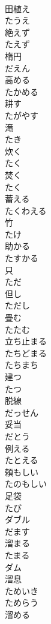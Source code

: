 \documentclass[8pt]{extreport}
\begin{document}
\begin{CJK}{UTF8}{min}
\\	田植え 
\\	たうえ	
\\	絶えず 
\\	たえず	
\\	楕円 
\\	だえん	
\\	高める 
\\	たかめる	
\\	耕す 
\\	たがやす	
\\	滝 
\\	たき	
\\	炊く 
\\	たく	
\\	焚く 
\\	たく	
\\	蓄える 
\\	たくわえる	
\\	竹 
\\	たけ	
\\	助かる 
\\	たすかる	
\\	只 
\\	ただ	
\\	但し 
\\	ただし	
\\	畳む 
\\	たたむ	
\\	立ち止まる 
\\	たちどまる	
\\	たちまち	
\\	建つ 
\\	たつ	
\\	脱線 
\\	だっせん	
\\	妥当 
\\	だとう	
\\	例える 
\\	たとえる	
\\	頼もしい 
\\	たのもしい	
\\	足袋 
\\	たび	
\\	ダブル	
\\	だます	
\\	溜まる 
\\	たまる	
\\	ダム	
\\	溜息 
\\	ためいき	
\\	ためらう	
\\	溜める 

\end{CJK}
\end{document}
